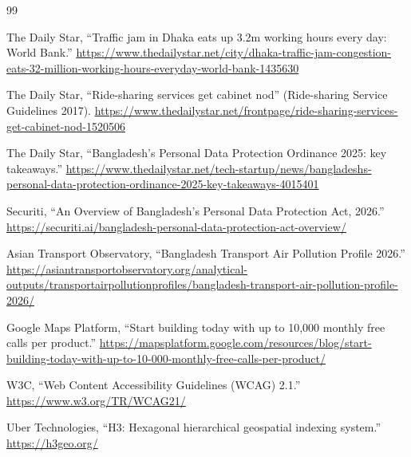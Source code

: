 \documentclass[12pt,a4paper]{report}
\begin{document}


\setcounter{chapter}{2}




\begin{thebibliography}{99}

The Daily Star, ``Traffic jam in Dhaka eats up 3.2m working hours every day:
World Bank.''
\url{https://www.thedailystar.net/city/dhaka-traffic-jam-congestion-eats-32-million-working-hours-everyday-world-bank-1435630}

The Daily Star, ``Ride-sharing services get cabinet nod'' (Ride-sharing
Service Guidelines 2017).
\url{https://www.thedailystar.net/frontpage/ride-sharing-services-get-cabinet-nod-1520506}

The Daily Star, ``Bangladesh's Personal Data Protection Ordinance 2025: key
takeaways.''
\url{https://www.thedailystar.net/tech-startup/news/bangladeshs-personal-data-protection-ordinance-2025-key-takeaways-4015401}

Securiti, ``An Overview of Bangladesh's Personal Data Protection Act, 2026.''
\url{https://securiti.ai/bangladesh-personal-data-protection-act-overview/}

Asian Transport Observatory, ``Bangladesh Transport Air Pollution Profile
2026.''
\url{https://asiantransportobservatory.org/analytical-outputs/transportairpollutionprofiles/bangladesh-transport-air-pollution-profile-2026/}

Google Maps Platform, ``Start building today with up to 10,000 monthly free
calls per product.''
\url{https://mapsplatform.google.com/resources/blog/start-building-today-with-up-to-10-000-monthly-free-calls-per-product/}

W3C, ``Web Content Accessibility Guidelines (WCAG) 2.1.''
\url{https://www.w3.org/TR/WCAG21/}

Uber Technologies, ``H3: Hexagonal hierarchical geospatial indexing system.''
\url{https://h3geo.org/}

\end{thebibliography}
\end{document}
